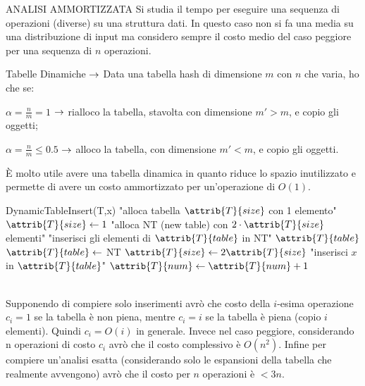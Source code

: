 \documentclass[8pt]{extarticle}
\begin{document}
\begin{formulario}
		\begin{myParagraph}{ANALISI AMMORTIZZATA}
Si studia il tempo per eseguire una sequenza di operazioni (diverse) su una struttura dati. In questo caso non si fa una media su una distribuzione di input ma considero sempre il costo medio del caso peggiore per una sequenza di $n$ operazioni.
			\begin{descr}{0}
				\item[Tabelle Dinamiche] $\rightarrow$ Data una tabella hash di dimensione $m$ con $n$ che varia, ho che se:
				\begin{descr}{0}
					\item[$\alpha=\frac{n}{m}=1$] $\rightarrow$ rialloco la tabella, stavolta con dimensione $m'>m$, e copio gli oggetti;
					\item[$\alpha=\frac{n}{m}\leq0.5$] $\rightarrow$ alloco la tabella, con dimensione $m'<m$, e copio gli oggetti.
				\end{descr}
È molto utile avere una tabella dinamica in quanto riduce lo spazio inutilizzato e permette di avere un costo ammortizzato per un'operazione di $O(1)$.
				\begin{code}{DynamicTableInsert(T,x)}
\li {}
	\li "alloca tabella $\attrib{T}{size}$ con 1 elemento"
	\li $\attrib{T}{size} \la 1$
\End
\li {}
	\li "alloca NT (new table) con $2\cdot \attrib{T}{size}$ elementi"
	\li "inserisci gli elementi di $\attrib{T}{table}$ in NT"
	\li {} $\attrib{T}{table}$
	\li $\attrib{T}{table}\la$ NT
	\li $\attrib{T}{size}\la 2\attrib{T}{size}$
\End
\li "inserisci $x$ in $\attrib{T}{table}$"
\li $\attrib{T}{num}\la \attrib{T}{num}+1$
				\end{code}
			\end{descr}
\\
Supponendo di compiere solo inserimenti avrò che costo della $i$-esima operazione $c_i=1$ se la tabella è non piena, mentre $c_i=i$ se la tabella è piena (copio $i$ elementi). Quindi $c_i=O(i)$ in generale. Invece nel caso peggiore, considerando n operazioni di costo $c_i$ avrò che il costo complessivo è $O(n^2)$. Infine per compiere un'analisi esatta (considerando solo le espansioni della tabella che realmente avvengono) avrò che il costo per $n$ operazioni è $<3n$.
		\end{myParagraph}


\end{formulario}
\end{document}
